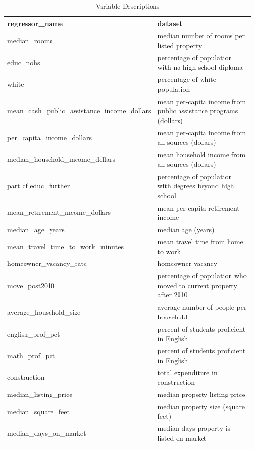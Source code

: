 \begin{table}[!htb]
    \centering
    \caption{Variable Descriptions}\label{variable_descriptions}
    \begin{tabular}{l|l}
    \hline
        \textbf{regressor\_name} &         \textbf{dataset} \\
    \hline
    \hline
    median\_rooms &  median number of rooms per listed property \\ \hline
    educ\_nohs &  percentage of population with no high school diploma \\ \hline
    white &  percentage of white population \\ \hline
        mean\_cash\_public\_assistance\_income\_dollars &  mean per-capita income from public assistance programs (dollars) \\ \hline
    per\_capita\_income\_dollars &  mean per-capita income from all sources (dollars) \\ \hline
    median\_household\_income\_dollars &  mean household income from all sources (dollars) \\ \hline
    part of educ\_further &  percentage of population with degrees beyond high school \\ \hline
    mean\_retirement\_income\_dollars &  mean per-capita retirement income \\ \hline
        median\_age\_years &  median age (years) \\ \hline
    mean\_travel\_time\_to\_work\_minutes &  mean travel time from home to work \\ \hline
    homeowner\_vacancy\_rate &  homeowner vacancy \\ \hline
    move\_post2010 &  percentage of population who moved to current property after 2010 \\ \hline
    average\_household\_size &  average number of people per household \\ \hline
    english\_prof\_pct &             percent of students proficient in English \\ \hline
    math\_prof\_pct &             percent of students proficient in English \\ \hline
    construction &              total expenditure in construction \\ \hline
    median\_listing\_price &           median property listing price \\ \hline
    median\_square\_feet &           median property size (square feet) \\ \hline
    median\_days\_on\_market &           median days property is listed on market \\ \hline

\end{tabular}
\end{table}
